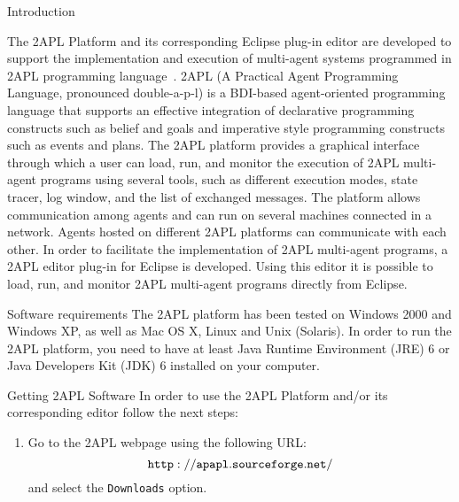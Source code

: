 \begin{chapter}{Introduction}
\label{chap:introduction}

The 2APL Platform and its corresponding Eclipse plug-in editor are
developed to support the implementation and execution of multi-agent
systems programmed in 2APL programming
language~\cite{Dastani:08a,D-RULECHP09,CLIMA09}. 2APL (A Practical
Agent Programming Language, pronounced double-a-p-l) is a BDI-based
agent-oriented programming language that supports an effective
integration of declarative programming constructs such as belief and
goals and imperative style programming constructs such as events and
plans. The 2APL platform provides a graphical interface through
which a user can load, run, and monitor the execution of 2APL
multi-agent programs using several tools, such as different
execution modes, state tracer, log window, and the list of exchanged
messages. The platform allows communication among agents and can run
on several machines connected in a network. Agents hosted on
different 2APL platforms can communicate with each other. In order
to facilitate the implementation of 2APL multi-agent programs, a
2APL editor plug-in for Eclipse is developed. Using this editor it
is possible to load, run, and monitor 2APL multi-agent programs
directly from Eclipse.

\begin{section}{Software requirements}
The 2APL platform has been tested on Windows 2000 and Windows XP, as
well as Mac OS X, Linux and Unix (Solaris). In order to run the 2APL
platform, you need to have at least Java Runtime Environment (JRE) 6
or Java Developers Kit (JDK) 6 installed on your computer.
\end{section}

\begin{section}{Getting 2APL Software}
In order to use the 2APL Platform and/or its corresponding editor
follow the next steps:
\begin{enumerate}
    \item Go to the 2APL webpage using the following URL:
          $${\tt http://apapl.sourceforge.net/}$$
          and select the {\tt Downloads} option.


\end{enumerate}
\end{section}
\end{chapter}
